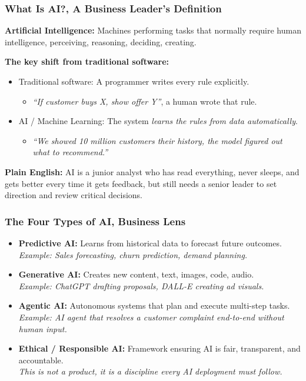 \begin{frame}[fragile]\frametitle{What Is AI?, A Business Leader's Definition}

\textbf{Artificial Intelligence:} Machines performing tasks that normally require human intelligence, perceiving, reasoning, deciding, creating.

\vspace{0.5em}
\textbf{The key shift from traditional software:}
\begin{itemize}
  \item Traditional software: A programmer writes every rule explicitly.
  \begin{itemize}
    \item \textit{``If customer buys X, show offer Y''}, a human wrote that rule.
  \end{itemize}
  \item AI / Machine Learning: The system \textit{learns the rules from data automatically}.
  \begin{itemize}
    \item \textit{``We showed 10 million customers their history, the model figured out what to recommend.''}
  \end{itemize}
\end{itemize}

\vspace{0.3em}
\textbf{Plain English:} AI is a junior analyst who has read everything, never sleeps, and gets better every time it gets feedback, but still needs a senior leader to set direction and review critical decisions.

\end{frame}

\begin{frame}[fragile]\frametitle{The Four Types of AI, Business Lens}

    \begin{itemize}
      \item \textbf{Predictive AI:} Learns from historical data to forecast future outcomes.\\
        \textit{Example: Sales forecasting, churn prediction, demand planning.}
      \item \textbf{Generative AI:} Creates new content, text, images, code, audio.\\
        \textit{Example: ChatGPT drafting proposals, DALL-E creating ad visuals.}
      \item \textbf{Agentic AI:} Autonomous systems that plan and execute multi-step tasks.\\
        \textit{Example: AI agent that resolves a customer complaint end-to-end without human input.}
      \item \textbf{Ethical / Responsible AI:} Framework ensuring AI is fair, transparent, and accountable.\\
        \textit{This is not a product, it is a discipline every AI deployment must follow.}
    \end{itemize}

\end{frame}

